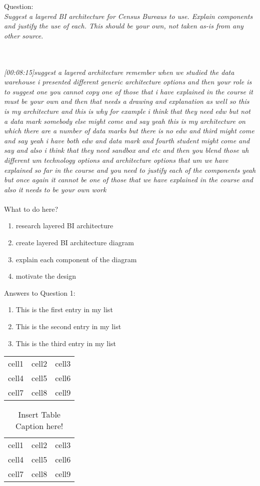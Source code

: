 Question:\\
\emph{Suggest a layered BI architecture for Census Bureaus to use. Explain components and
justify the use of each. This should be your own, not taken as-is from any other source.}

\\\\
\emph{[00:08:15]suggest a layered architecture remember when we studied the data warehouse i presented
different generic architecture options and then your role is to suggest one you cannot copy one of those that i have explained in the course it must be your own
and then that needs a drawing and explanation as well so this is my architecture and this is why for example
i think that they need edw but not a data mark somebody else might come and say
yeah this is my architecture on which there are a number of data marks but there is no edw and third might come
and say yeah i have both edw and data mark and fourth student might come and say and also i think that they need sandbox and etc and then you blend those
uh different um technology options and architecture options that um we have explained so far in the course and you need to justify each of the components
yeah but once again it cannot be one of those that we have explained in the course and also it needs to be your own work}\\\\
What to do here?
\begin{enumerate}
    \item research layered BI architecture
    \item create layered BI architecture diagram
    \item explain each component of the diagram
    \item motivate the design
  \end{enumerate}

\newpage Answers to Question 1:

\newpage 
\begin{enumerate}
  \item This is the first entry in my list
  \item This is the second entry in my list
  \item This is the third entry in my list
\end{enumerate}

\begin{center}
    \begin{tabular}{ c c c }
        cell1 & cell2 & cell3 \\ 
        cell4 & cell5 & cell6 \\  
        cell7 & cell8 & cell9    
    \end{tabular}
\end{center}

\begin{table}[h]
\centering
    \begin{tabular}{ |c| c| c| }
     \hline
        cell1 & cell2 & cell3 \\ 
        cell4 & cell5 & cell6 \\  
        cell7 & cell8 & cell9 \\  
     \hline
    \end{tabular}\\
    \caption{Insert Table Caption here!}
    \label{table:1}
\end{table}